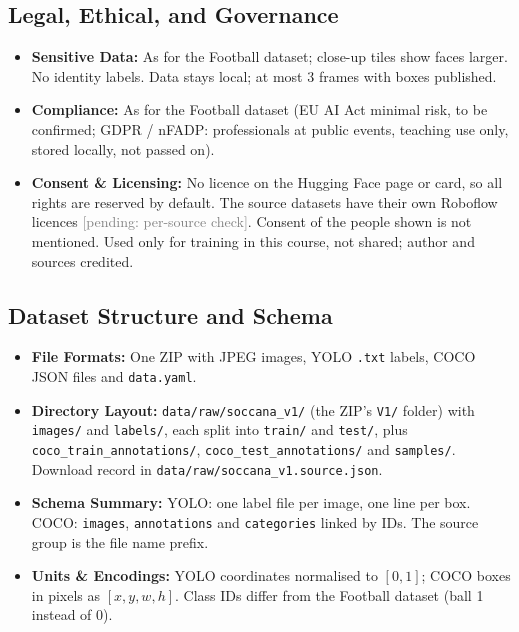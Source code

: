 \documentclass[11pt, a4paper]{article}
\newcommand{\pending}[1]{\textcolor{gray}{[pending: #1]}}
\begin{document}
\subsection{Legal, Ethical, and Governance}
\begin{itemize}
    \item \textbf{Sensitive Data:} As for the Football dataset; close-up tiles show faces larger. No identity labels. Data stays local; at most 3 frames with boxes published.
    \item \textbf{Compliance:} As for the Football dataset (EU AI Act minimal risk, to be confirmed; GDPR / nFADP: professionals at public events, teaching use only, stored locally, not passed on).
    \item \textbf{Consent \& Licensing:} No licence on the Hugging Face page or card, so all rights are reserved by default. The source datasets have their own Roboflow licences \pending{per-source check}. Consent of the people shown is not mentioned. Used only for training in this course, not shared; author and sources credited.
\end{itemize}

\subsection{Dataset Structure and Schema}
\begin{itemize}
    \item \textbf{File Formats:} One ZIP with JPEG images, YOLO \texttt{.txt} labels, COCO JSON files and \texttt{data.yaml}.
    \item \textbf{Directory Layout:} \texttt{data/raw/soccana\_v1/} (the ZIP's \texttt{V1/} folder) with \texttt{images/} and \texttt{labels/}, each split into \texttt{train/} and \texttt{test/}, plus \texttt{coco\_train\_annotations/}, \texttt{coco\_test\_annotations/} and \texttt{samples/}. Download record in \texttt{data/raw/soccana\_v1.source.json}.
    \item \textbf{Schema Summary:} YOLO: one label file per image, one line per box. COCO: \texttt{images}, \texttt{annotations} and \texttt{categories} linked by IDs. The source group is the file name prefix.
    \item \textbf{Units \& Encodings:} YOLO coordinates normalised to $[0,1]$; COCO boxes in pixels as $[x, y, w, h]$. Class IDs differ from the Football dataset (ball 1 instead of 0).
\end{itemize}

\end{document}

